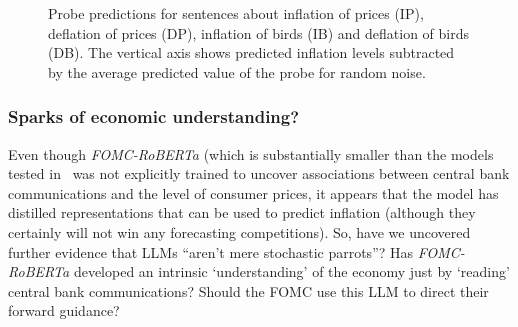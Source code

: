 \documentclass{article}
\theoremstyle{plain}
\theoremstyle{definition}
\theoremstyle{remark}
\begin{document}
\begin{figure}


\caption{\label{fig-attack}Probe predictions for sentences about inflation of prices (IP), deflation of prices (DP), inflation of birds (IB) and deflation of birds (DB). The vertical axis shows predicted inflation levels subtracted by the average predicted value of the probe for random noise.}

\end{figure}%

\subsubsection{Sparks of economic understanding?}\label{stochastic-parrots-after-all}
Even though \emph{FOMC-RoBERTa} (which is substantially smaller than the models tested in~\citet{gurnee2023languagev2} was not explicitly trained to uncover associations between central bank communications and the level of consumer prices, it appears that the model has distilled representations that can be used to predict inflation (although they certainly will not win any forecasting competitions). So, have we uncovered further evidence that LLMs ``aren't mere stochastic
parrots''? Has \emph{FOMC-RoBERTa} developed an intrinsic `understanding'
of the economy just by `reading' central bank communications? Should the FOMC use this LLM to direct their forward guidance? 


\end{document}
